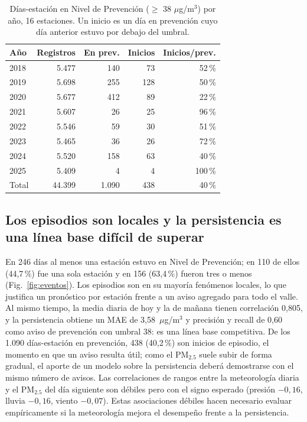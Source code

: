 \documentclass[conference]{IEEEtran}
\begin{document}
\begin{table}[htbp]
\centering
\caption{Días-estación en Nivel de Prevención ($\geq$ 38 $\mu$g/m$^3$) por
año, 16 estaciones. Un inicio es un día en prevención cuyo día anterior
estuvo por debajo del umbral.}
\label{tab:eventos}
\begin{tabular}{lrrrr}
\toprule
\textbf{Año} & \textbf{Registros} & \textbf{En prev.} & \textbf{Inicios} & \textbf{Inicios/prev.} \\
\midrule
2018 & 5.477 & 140 & 73 & 52\,\% \\
2019 & 5.698 & 255 & 128 & 50\,\% \\
2020 & 5.677 & 412 & 89 & 22\,\% \\
2021 & 5.607 & 26 & 25 & 96\,\% \\
2022 & 5.546 & 59 & 30 & 51\,\% \\
2023 & 5.465 & 36 & 26 & 72\,\% \\
2024 & 5.520 & 158 & 63 & 40\,\% \\
2025 & 5.409 & 4 & 4 & 100\,\% \\
\midrule
Total & 44.399 & 1.090 & 438 & 40\,\% \\
\bottomrule
\end{tabular}
\end{table}

\subsection{Los episodios son locales y la persistencia es una línea base difícil de superar}

En 246 días al menos una estación estuvo en Nivel de Prevención; en 110 de
ellos (44,7\,\%) fue una sola estación y en 156 (63,4\,\%) fueron tres o menos
(Fig.~\ref{fig:eventos}). Los episodios son en su mayoría fenómenos
locales, lo que justifica un pronóstico por estación frente a un aviso
agregado para todo el valle. Al mismo tiempo, la media diaria de hoy y la de
mañana tienen correlación 0,805, y la persistencia obtiene un MAE de
3,58~$\mu$g/m$^3$ y precisión y recall de 0,60 como aviso de prevención con
umbral 38: es una línea base competitiva. De los 1.090
días-estación en prevención, 438 (40,2\,\%) son inicios de episodio, el
momento en que un aviso resulta útil; como el PM$_{2.5}$ suele subir de
forma gradual, el aporte de un modelo sobre la persistencia deberá
demostrarse con el mismo número de avisos. Las correlaciones de rangos entre
la meteorología diaria y el PM$_{2.5}$ del día siguiente son débiles pero
con el signo esperado (presión $-0{,}16$, lluvia $-0{,}16$, viento
$-0{,}07$). Estas asociaciones débiles hacen necesario evaluar empíricamente
si la meteorología mejora el desempeño frente a la persistencia.
\end{document}
